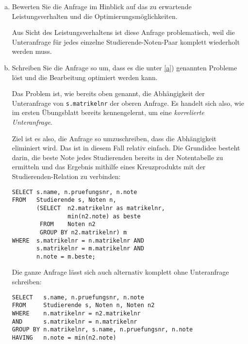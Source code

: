 \begin{enumerate}[a)]

  \item \label{a} Bewerten Sie die Anfrage im Hinblick auf das zu erwartende Leistungsverhalten
    und die Optimierungsmöglichkeiten.

\begin{solution}
Aus Sicht des Leistungsverhaltens ist diese Anfrage problematisch,
weil die Unteranfrage für jedes einzelne Studierende-Noten-Paar
komplett wiederholt werden muss.
\end{solution}

  \item Schreiben Sie die Anfrage so um, dass es die unter \ref{a}) genannten
    Probleme löst und die Bearbeitung optimiert werden kann.

\cprotEnv
\begin{solution}
Das Problem ist, wie bereits oben genannt, die Abhängigkeit der Unteranfrage
von \texttt{s.matrikelnr} der oberen Anfrage.
Es handelt sich also, wie im ersten Übungsblatt bereits kennengelernt,
um eine \emph{korrelierte Unteranfrage}.

Ziel ist es also, die Anfrage so umzuschreiben,
dass die Abhängigkeit eliminiert wird.
Das ist in diesem Fall relativ einfach.
Die Grundidee besteht darin, die beste Note jedes Studierenden bereits
in der Notentabelle zu ermitteln und das Ergebnis mithilfe eines Kreuzprodukts
mit der Studierenden-Relation zu verbinden:

\begin{lstlisting}
SELECT s.name, n.pruefungsnr, n.note
FROM   Studierende s, Noten n,
       (SELECT  n2.matrikelnr as matrikelnr,
                min(n2.note) as beste
        FROM    Noten n2
        GROUP BY n2.matrikelnr) m
WHERE  s.matrikelnr = n.matrikelnr AND
       s.matrikelnr = m.matrikelnr AND
       n.note = m.beste;
\end{lstlisting}

\cprotEnv
\begin{note}
Die ganze Anfrage lässt sich auch alternativ komplett ohne Unteranfrage schreiben:

\begin{lstlisting}
SELECT   s.name, n.pruefungsnr, n.note
FROM     Studierende s, Noten n, Noten n2
WHERE    n.matrikelnr = n2.matrikelnr
AND      s.matrikelnr = n.matrikelnr
GROUP BY n.matrikelnr, s.name, n.pruefungsnr, n.note
HAVING   n.note = min(n2.note)
\end{lstlisting}
\end{note}


\end{solution}
\end{enumerate}
